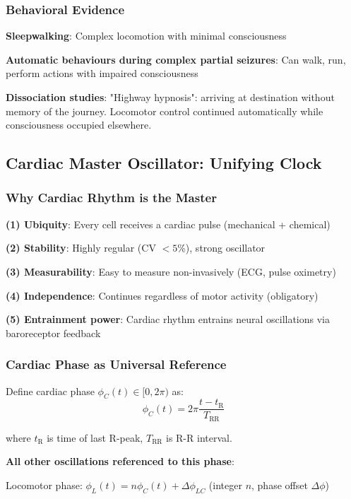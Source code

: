 \documentclass[11pt,onecolumn]{article}
\begin{document}
\subsubsection{Behavioral Evidence}

\textbf{Sleepwalking}: Complex locomotion with minimal consciousness

\textbf{Automatic behaviours during complex partial seizures}: Can walk, run, perform actions with impaired consciousness

\textbf{Dissociation studies}: "Highway hypnosis": arriving at destination without memory of the journey. Locomotor control continued automatically while consciousness occupied elsewhere.

\subsection{Cardiac Master Oscillator: Unifying Clock}

\subsubsection{Why Cardiac Rhythm is the Master}

\textbf{(1) Ubiquity}: Every cell receives a cardiac pulse (mechanical + chemical)

\textbf{(2) Stability}: Highly regular (CV $< 5$\%), strong oscillator

\textbf{(3) Measurability}: Easy to measure non-invasively (ECG, pulse oximetry)

\textbf{(4) Independence}: Continues regardless of motor activity (obligatory)

\textbf{(5) Entrainment power}: Cardiac rhythm entrains neural oscillations via baroreceptor feedback

\subsubsection{Cardiac Phase as Universal Reference}

Define cardiac phase $\phi_C(t) \in [0, 2\pi)$ as:
\begin{equation}
\phi_C(t) = 2\pi\frac{t - t_{\text{R}}}{T_{\text{RR}}}
\end{equation}

where $t_{\text{R}}$ is time of last R-peak, $T_{\text{RR}}$ is R-R interval.

\textbf{All other oscillations referenced to this phase}:

Locomotor phase: $\phi_L(t) = n\phi_C(t) + \Delta\phi_{LC}$ (integer $n$, phase offset $\Delta\phi$)
\end{document}
